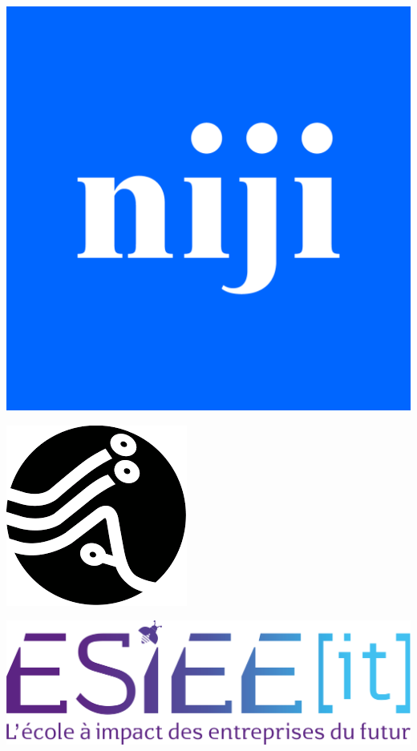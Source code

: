 \documentclass[12pt]{article}
\begin{document}
\begin{titlepage}
  \centering
  \begin{minipage}{0.28\textwidth}
    \centering
    \includegraphics[width=0.8\linewidth]{img/logo-niji.png}
  \end{minipage}
  \hfill
  \begin{minipage}{0.28\textwidth}
    \centering
    \includegraphics[width=0.8\linewidth]{img/iia-logo.png}
  \end{minipage}
  \hfill
  \begin{minipage}{0.28\textwidth}
    \centering
    \includegraphics[width=0.95\linewidth]{img/esiee-logo.png}
  \end{minipage}
  \vspace*{2cm}


\end{titlepage}
\end{document}
